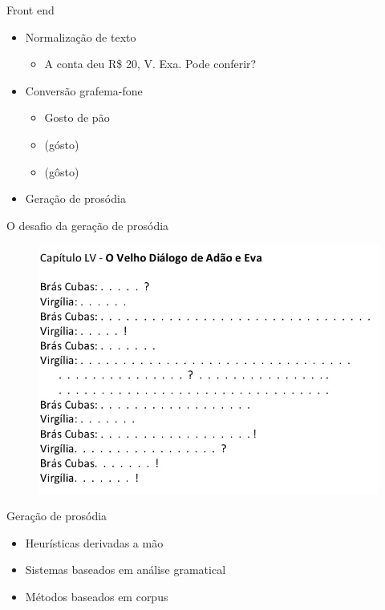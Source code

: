 \documentclass{beamer}
\begin{document}
\begin{frame}{Front end}
  \begin{itemize}
    \item Normalização de texto
      \begin{itemize}
        \item A conta deu R\$ 20, V. Exa. Pode conferir?
      \end{itemize}
    \item Conversão grafema-fone
      \begin{itemize}
        \item Gosto de pão
        \item \textipa{[gOstu]} (gósto)
        \item \textipa{[gostu]} (gôsto)
      \end{itemize}
    \item Geração de prosódia
  \end{itemize}
\end{frame}

\begin{frame}{O desafio da geração de prosódia}
  \pause
    \begin{figure}
      \includegraphics[scale=0.40]{machado.png}
    \end{figure}
\end{frame}

\begin{frame}{Geração de prosódia}
      \begin{itemize}
        \item Heurísticas derivadas a mão
        \item Sistemas baseados em análise gramatical
        \item Métodos baseados em corpus
      \end{itemize}
\end{frame}
\end{document}
